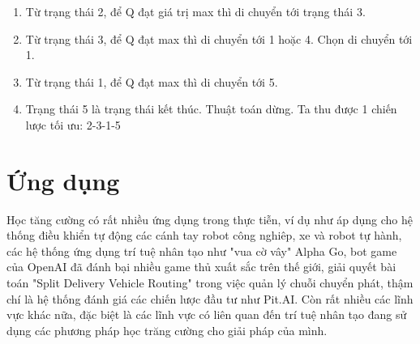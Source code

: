 \documentclass[14pt,a4paper,oneside]{report}		%
\begin{document}
\begin{enumerate}
\item Từ trạng thái 2, để Q đạt giá trị max thì di chuyển tới trạng thái 3. 
\item Từ trạng thái 3, để Q đạt max thì di chuyển tới 1 hoặc 4. Chọn di chuyển tới 1.
\item Từ trạng thái 1, để Q đạt max thì di chuyển tới 5.
\item Trạng thái 5 là trạng thái kết thúc. Thuật toán dừng. Ta thu được 1 chiến lược tối ưu: 2-3-1-5
\end{enumerate}

\chapter{Ứng dụng}
Học tăng cường có rất nhiều ứng dụng trong thực tiễn, ví dụ như áp dụng cho hệ thống điều khiển tự động các cánh tay robot công nghiêp, xe và robot tự hành, các hệ thống ứng dụng trí tuệ nhân tạo như "vua cờ vây" Alpha Go, bot game của OpenAI đã đánh bại nhiều game thủ xuất sắc trên thế giới, giải quyết bài toán "Split Delivery Vehicle Routing" trong việc quản lý chuỗi chuyển phát, thậm chí là hệ thống đánh giá các chiến lược đầu tư như Pit.AI. Còn rất nhiều các lĩnh vực khác nữa, đặc biệt là các lĩnh vực có liên quan đến trí tuệ nhân tạo đang sử dụng các phương pháp học trăng cường cho giải pháp của mình.\\
	
\end{document}
